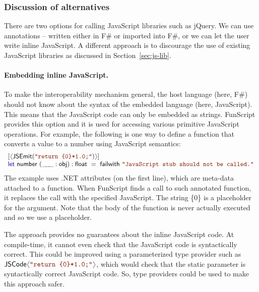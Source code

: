 \documentclass[submission,copyright,creativecommons]{eptcs}
\newcommand{\langl}{\begin{picture}(4.5,7)
\put(1.1,2.5){\rotatebox{60}{\line(1,0){5.5}}}
\put(1.1,2.5){\rotatebox{300}{\line(1,0){5.5}}}
\end{picture}}
\newcommand{\rangl}{\begin{picture}(4.5,7)
\put(.9,2.5){\rotatebox{120}{\line(1,0){5.5}}}
\put(.9,2.5){\rotatebox{240}{\line(1,0){5.5}}}
\end{picture}}
\newcommand{\ignp}{\_\kern-.5ex\_\kern-.5ex\_ }
\newcommand{\kvd}[1]{\textnormal{\textcolor{kvdclr}{\sffamily #1}}}
\newcommand{\str}[1]{\textnormal{\textcolor{strclr}{\ttfamily "#1"}}}
\newcommand{\ident}[1]{\textnormal{\sffamily #1}}
\begin{document}
\subsubsection{Discussion of alternatives}
There are two options for calling JavaScript libraries such as jQuery. We can use annotations
-- written either in F\# or imported into F\#, or we can let the user write inline JavaScript.
A different approach is to discourage the use of existing JavaScript libraries as discussed in
Section~\ref{sec:js-lib}.

\vspace{-1em}
\paragraph{Embedding inline JavaScript.}
To make the interoperability mechanism general, the host language (here, F\#) should not know about
the syntax of the embedded language (here, JavaScript). This means that the JavaScript code can
only be embedded as strings. FunScript provides this option and it is used for accessing various
primitive JavaScript operations. For example, the following is one way to define a function that
converts a value to a number using JavaScript semantics:
%
\begin{equation*}
\begin{array}{l}
 \lbrack\langl\ident{JSEmit}(\str{return \{0\}*1.0;})\rangl\rbrack \\
 \kvd{let}~\ident{number}~(\ignp:\ident{obj}) : \ident{float} ~=~\ident{failwith}~\str{JavaScript stub should not be called.}
\end{array}
\end{equation*}
%
The example uses .NET attributes (on the first line), which are meta-data attached to a function.
When FunScript finds a call to such annotated function, it replaces the call with the specified
JavaScript. The string \textcolor{strclr}{\ttfamily \{0\}} is a placeholder for the argument. Note
that the body of the function is never actually executed and so we use a placeholder.

The approach provides no guarantees about the inline JavaScript code. At compile-time, it cannot
even check that the JavaScript code is syntactically correct. This could be improved using a
parameterized type provider such as $\ident{JSCode}\langl\str{return \{0\}*1.0;}\rangl$, which
would check that the static parameter is syntactically correct JavaScript code. So, type providers
could be used to make this approach safer.
\end{document}
